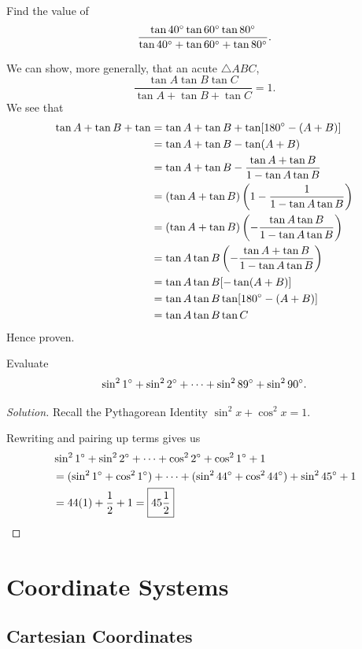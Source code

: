 \begin{prbm}
Find the value of
\[ \frac{\tan40\degree\tan60\degree\tan80\degree}{\tan40\degree+\tan60\degree+\tan80\degree}. \]
\end{prbm}
\begin{solution}
We can show, more generally, that an acute $\triangle ABC$,
\[ \frac{\tan A\tan B\tan C}{\tan A+\tan B+\tan C}=1. \]
We see that
\begin{align*}
\tan A+\tan B+\tan 
&= \tan A+\tan B+\tan[180\degree-(A+B)] \\
&= \tan A+\tan B-\tan(A+B) \\
&= \tan A+\tan B-\frac{\tan A+\tan B}{1-\tan A\tan B} \\
&= (\tan A+\tan B)\left(1-\frac{1}{1-\tan A\tan B}\right) \\
&= (\tan A+\tan B)\left(-\frac{\tan A\tan B}{1-\tan A\tan B}\right) \\
&= \tan A\tan B\left(-\frac{\tan A+\tan B}{1-\tan A\tan B}\right) \\
&= \tan A\tan B[-\tan(A+B)] \\
&= \tan A\tan B\tan[180\degree-(A+B)] \\
&= \tan A\tan B\tan C
\end{align*}
Hence proven.
\end{solution}
\pagebreak

\begin{prbm}
Evaluate 
\[ \sin^2 1\degree + \sin^2 2\degree + \dots + \sin^2 89\degree + \sin^2 90\degree. \]
\end{prbm}

\begin{proof}[Solution]
Recall the Pythagorean Identity $\sin^2 x + \cos^2 x = 1$.

Rewriting and pairing up terms gives us 
\begin{align*}
&\sin^2 1\degree + \sin^2 2\degree + \dots + \cos^2 2\degree + \cos^2 1\degree + 1 \\
&= (\sin^2 1\degree + \cos^2 1\degree) + \dots + (\sin^2 44\degree + \cos^2 44\degree) + \sin^2 45\degree + 1 \\
&= 44(1) + \frac{1}{2} + 1 = \boxed{45\frac{1}{2}}
\end{align*}
\end{proof}

\chapter{Coordinate Systems}
\section{Cartesian Coordinates}
